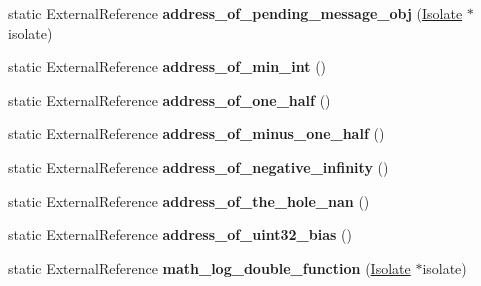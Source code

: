 \begin{DoxyCompactItemize}
\item 
static External\+Reference {\bfseries address\+\_\+of\+\_\+pending\+\_\+message\+\_\+obj} (\hyperlink{classv8_1_1internal_1_1_isolate}{Isolate} $\ast$isolate)\hypertarget{classv8_1_1internal_1_1_b_a_s_e___e_m_b_e_d_d_e_d_a124f183bb6aaf3a8087b483356a10f75}{}\label{classv8_1_1internal_1_1_b_a_s_e___e_m_b_e_d_d_e_d_a124f183bb6aaf3a8087b483356a10f75}

\item 
static External\+Reference {\bfseries address\+\_\+of\+\_\+min\+\_\+int} ()\hypertarget{classv8_1_1internal_1_1_b_a_s_e___e_m_b_e_d_d_e_d_a5d392c91fea29bbe538dea10b78f1853}{}\label{classv8_1_1internal_1_1_b_a_s_e___e_m_b_e_d_d_e_d_a5d392c91fea29bbe538dea10b78f1853}

\item 
static External\+Reference {\bfseries address\+\_\+of\+\_\+one\+\_\+half} ()\hypertarget{classv8_1_1internal_1_1_b_a_s_e___e_m_b_e_d_d_e_d_ad3c20df4754a4879d19d87d5cf782d62}{}\label{classv8_1_1internal_1_1_b_a_s_e___e_m_b_e_d_d_e_d_ad3c20df4754a4879d19d87d5cf782d62}

\item 
static External\+Reference {\bfseries address\+\_\+of\+\_\+minus\+\_\+one\+\_\+half} ()\hypertarget{classv8_1_1internal_1_1_b_a_s_e___e_m_b_e_d_d_e_d_a84e3c6e8c4e7f5f19f1f6af8470253b6}{}\label{classv8_1_1internal_1_1_b_a_s_e___e_m_b_e_d_d_e_d_a84e3c6e8c4e7f5f19f1f6af8470253b6}

\item 
static External\+Reference {\bfseries address\+\_\+of\+\_\+negative\+\_\+infinity} ()\hypertarget{classv8_1_1internal_1_1_b_a_s_e___e_m_b_e_d_d_e_d_a6d419665a9ef9eed6b91b122e4677afe}{}\label{classv8_1_1internal_1_1_b_a_s_e___e_m_b_e_d_d_e_d_a6d419665a9ef9eed6b91b122e4677afe}

\item 
static External\+Reference {\bfseries address\+\_\+of\+\_\+the\+\_\+hole\+\_\+nan} ()\hypertarget{classv8_1_1internal_1_1_b_a_s_e___e_m_b_e_d_d_e_d_ae64ab12a2284f9333e139061b45aab1e}{}\label{classv8_1_1internal_1_1_b_a_s_e___e_m_b_e_d_d_e_d_ae64ab12a2284f9333e139061b45aab1e}

\item 
static External\+Reference {\bfseries address\+\_\+of\+\_\+uint32\+\_\+bias} ()\hypertarget{classv8_1_1internal_1_1_b_a_s_e___e_m_b_e_d_d_e_d_a3b821434175f1310766282d1a863d475}{}\label{classv8_1_1internal_1_1_b_a_s_e___e_m_b_e_d_d_e_d_a3b821434175f1310766282d1a863d475}

\item 
static External\+Reference {\bfseries math\+\_\+log\+\_\+double\+\_\+function} (\hyperlink{classv8_1_1internal_1_1_isolate}{Isolate} $\ast$isolate)\hypertarget{classv8_1_1internal_1_1_b_a_s_e___e_m_b_e_d_d_e_d_a176c9b527992b9b28e764d849b4e5dcb}{}\label{classv8_1_1internal_1_1_b_a_s_e___e_m_b_e_d_d_e_d_a176c9b527992b9b28e764d849b4e5dcb}


\end{DoxyCompactItemize}
